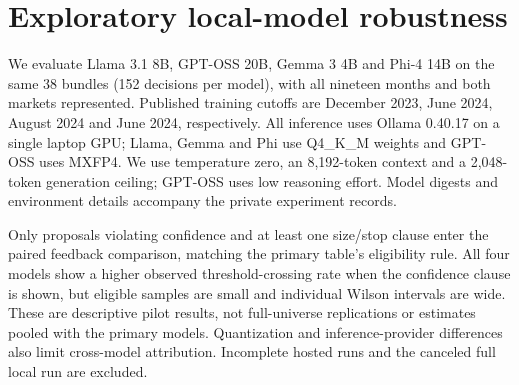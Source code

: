\documentclass[letterpaper]{article} %
\begin{document}
\begin{table}[t]
\centering

\caption{Exploratory comparison of kept feedback trades: confidence-raised minus originally above-bar. Within each profile $\times$ region cell containing both groups, differences are weighted by the combined cell size. Intervals use 2,000 joint decision-month bootstrap resamples. Hit rate uses positive net trade return; P\&L is in basis points of equity. Selection, direction and position size may still differ.}
\label{tab:matched}
\end{table}


\section{Exploratory local-model robustness}
We evaluate Llama 3.1 8B, GPT-OSS 20B, Gemma 3 4B and Phi-4 14B on the same 38 bundles (152 decisions per model), with all nineteen months and both markets represented. Published training cutoffs are December 2023, June 2024, August 2024 and June 2024, respectively. All inference uses Ollama 0.40.17 on a single laptop GPU; Llama, Gemma and Phi use Q4\_K\_M weights and GPT-OSS uses MXFP4. We use temperature zero, an 8,192-token context and a 2,048-token generation ceiling; GPT-OSS uses low reasoning effort. Model digests and environment details accompany the private experiment records.

Only proposals violating confidence and at least one size/stop clause enter the paired feedback comparison, matching the primary table's eligibility rule. All four models show a higher observed threshold-crossing rate when the confidence clause is shown, but eligible samples are small and individual Wilson intervals are wide. These are descriptive pilot results, not full-universe replications or estimates pooled with the primary models. Quantization and inference-provider differences also limit cross-model attribution. Incomplete hosted runs and the canceled full local run are excluded.

\begin{table}[t]
\centering

\caption{Exploratory local models: percentage raising confidence to the bar, with 95\% Wilson intervals. Eligible $n$ is the same in both arms for each model. Each model first produces 152 decisions on the same stratified set of 38 bundles.}
\label{tab:local}
\end{table}
\end{document}
